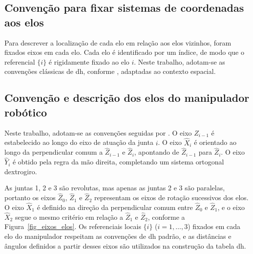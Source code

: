 

% 



\subsection{Convenção para fixar sistemas de coordenadas aos elos}
\label{sec_convencao_sistCoordenadas_elos}

Para descrever a localização de cada elo em relação aos elos vizinhos, foram fixados eixos em cada elo.
Cada elo é identificado por um índice, de modo que o referencial $\{i\}$ é rigidamente fixado ao elo $i$.
Neste trabalho, adotam-se as convenções clássicas de \gls{dh}, conforme \cite{sciavicco_siciliano2010}, adaptadas ao contexto espacial.

\subsection{Convenção e descrição dos elos do manipulador robótico}
\label{sec_convencao_dh_mr}

Neste trabalho, adotam-se as convenções seguidas por \cite{sciavicco_siciliano2010}.
O eixo $\hat{Z}_{i-1}$ é estabelecido ao longo do eixo de atuação da junta $i$. 
O eixo $\hat{X}_i$ é orientado ao longo da perpendicular comum a $\hat{Z}_{i-1}$ e $\hat{Z}_i$, apontando de $\hat{Z}_{i-1}$ para $\hat{Z}_i$. O eixo $\hat{Y}_i$ é obtido pela regra da mão direita, completando um sistema ortogonal dextrogiro.

As juntas 1, 2 e 3 são revolutas, mas apenas as juntas 2 e 3 são paralelas, portanto os eixos $\hat{Z}_0$, $\hat{Z}_1$ e $\hat{Z}_2$ representam os eixos de rotação sucessivos dos elos.
O eixo $\hat{X}_1$ é definido na direção da perpendicular comum entre $\hat{Z}_0$ e $\hat{Z}_1$, e o eixo $\hat{X}_2$ segue o mesmo critério em relação a $\hat{Z}_1$ e $\hat{Z}_2$, conforme a Figura~\ref{fig_eixos_elos}.
Os referenciais locais $\{i\}$ ($i=1,\dots,3$) fixados em cada elo do manipulador respeitam as convenções de \gls{dh} padrão, e as distâncias e ângulos definidos a partir desses eixos são utilizados na construção da tabela \gls{dh}.


